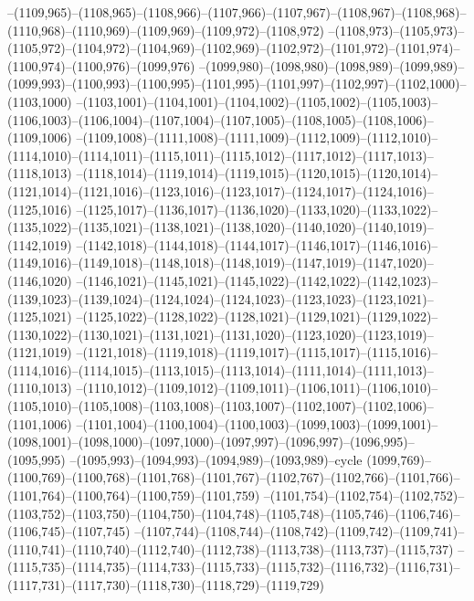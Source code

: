 --(1109,965)--(1108,965)--(1108,966)--(1107,966)--(1107,967)--(1108,967)--(1108,968)--(1110,968)--(1110,969)--(1109,969)--(1109,972)--(1108,972)
--(1108,973)--(1105,973)--(1105,972)--(1104,972)--(1104,969)--(1102,969)--(1102,972)--(1101,972)--(1101,974)--(1100,974)--(1100,976)--(1099,976)
--(1099,980)--(1098,980)--(1098,989)--(1099,989)--(1099,993)--(1100,993)--(1100,995)--(1101,995)--(1101,997)--(1102,997)--(1102,1000)--(1103,1000)
--(1103,1001)--(1104,1001)--(1104,1002)--(1105,1002)--(1105,1003)--(1106,1003)--(1106,1004)--(1107,1004)--(1107,1005)--(1108,1005)--(1108,1006)--(1109,1006)
--(1109,1008)--(1111,1008)--(1111,1009)--(1112,1009)--(1112,1010)--(1114,1010)--(1114,1011)--(1115,1011)--(1115,1012)--(1117,1012)--(1117,1013)--(1118,1013)
--(1118,1014)--(1119,1014)--(1119,1015)--(1120,1015)--(1120,1014)--(1121,1014)--(1121,1016)--(1123,1016)--(1123,1017)--(1124,1017)--(1124,1016)--(1125,1016)
--(1125,1017)--(1136,1017)--(1136,1020)--(1133,1020)--(1133,1022)--(1135,1022)--(1135,1021)--(1138,1021)--(1138,1020)--(1140,1020)--(1140,1019)--(1142,1019)
--(1142,1018)--(1144,1018)--(1144,1017)--(1146,1017)--(1146,1016)--(1149,1016)--(1149,1018)--(1148,1018)--(1148,1019)--(1147,1019)--(1147,1020)--(1146,1020)
--(1146,1021)--(1145,1021)--(1145,1022)--(1142,1022)--(1142,1023)--(1139,1023)--(1139,1024)--(1124,1024)--(1124,1023)--(1123,1023)--(1123,1021)--(1125,1021)
--(1125,1022)--(1128,1022)--(1128,1021)--(1129,1021)--(1129,1022)--(1130,1022)--(1130,1021)--(1131,1021)--(1131,1020)--(1123,1020)--(1123,1019)--(1121,1019)
--(1121,1018)--(1119,1018)--(1119,1017)--(1115,1017)--(1115,1016)--(1114,1016)--(1114,1015)--(1113,1015)--(1113,1014)--(1111,1014)--(1111,1013)--(1110,1013)
--(1110,1012)--(1109,1012)--(1109,1011)--(1106,1011)--(1106,1010)--(1105,1010)--(1105,1008)--(1103,1008)--(1103,1007)--(1102,1007)--(1102,1006)--(1101,1006)
--(1101,1004)--(1100,1004)--(1100,1003)--(1099,1003)--(1099,1001)--(1098,1001)--(1098,1000)--(1097,1000)--(1097,997)--(1096,997)--(1096,995)--(1095,995)
--(1095,993)--(1094,993)--(1094,989)--(1093,989)--cycle
(1099,769)--(1100,769)--(1100,768)--(1101,768)--(1101,767)--(1102,767)--(1102,766)--(1101,766)--(1101,764)--(1100,764)--(1100,759)--(1101,759)
--(1101,754)--(1102,754)--(1102,752)--(1103,752)--(1103,750)--(1104,750)--(1104,748)--(1105,748)--(1105,746)--(1106,746)--(1106,745)--(1107,745)
--(1107,744)--(1108,744)--(1108,742)--(1109,742)--(1109,741)--(1110,741)--(1110,740)--(1112,740)--(1112,738)--(1113,738)--(1113,737)--(1115,737)
--(1115,735)--(1114,735)--(1114,733)--(1115,733)--(1115,732)--(1116,732)--(1116,731)--(1117,731)--(1117,730)--(1118,730)--(1118,729)--(1119,729)

